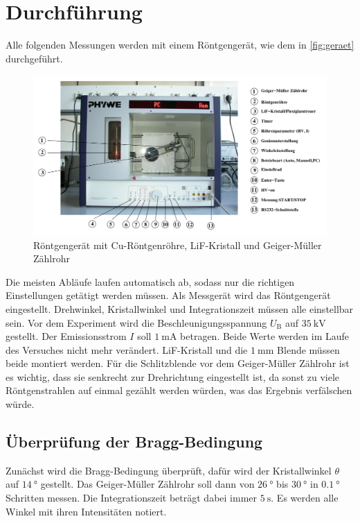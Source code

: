 \section{Durchführung}
\label{sec:Durchführung}


Alle folgenden Messungen werden mit einem Röntgengerät, wie dem in \autoref{fig:geraet} durchgeführt.

\begin{figure}
    \centering
    \includegraphics[width=\textwidth]{images/bild4.png}
    \caption{Röntgengerät mit Cu-Röntgenröhre, LiF-Kristall und Geiger-Müller Zählrohr}
    \label{fig:geraet}
\end{figure}

Die meisten Abläufe laufen automatisch ab, sodass nur die richtigen Einstellungen getätigt werden müssen.
Als Messgerät wird das Röntgengerät eingestellt.
Drehwinkel, Kristallwinkel und Integrationszeit müssen alle einstellbar sein.
Vor dem Experiment wird die Beschleunigungsspannung $U_\text{B}$ auf $\SI{35}{\kilo\volt}$ gestellt.
Der Emissionsstrom $I$ soll $\SI{1}{\milli\ampere}$ betragen.
Beide Werte werden im Laufe des Versuches nicht mehr verändert.
LiF-Kristall und die $\SI{1}{\milli\meter}$ Blende müssen beide montiert werden.
Für die Schlitzblende vor dem Geiger-Müller Zählrohr ist es wichtig, dass sie senkrecht zur Drehrichtung eingestellt ist, da sonst zu viele Röntgenstrahlen auf einmal gezählt werden würden, was das Ergebnis verfälschen würde.

\subsection{Überprüfung der Bragg-Bedingung}
\label{ssec:bragg}

Zunächst wird die Bragg-Bedingung überprüft, dafür wird der Kristallwinkel $\theta$ auf $\SI{14}{\degree}$ gestellt.
Das Geiger-Müller Zählrohr soll dann von $\SI{26}{\degree}$ bis $\SI{30}{\degree}$ in $\SI{0.1}{\degree}$ Schritten messen. 
Die Integrationszeit beträgt dabei immer $\SI{5}{\second}$.
Es werden alle Winkel mit ihren Intensitäten notiert.

